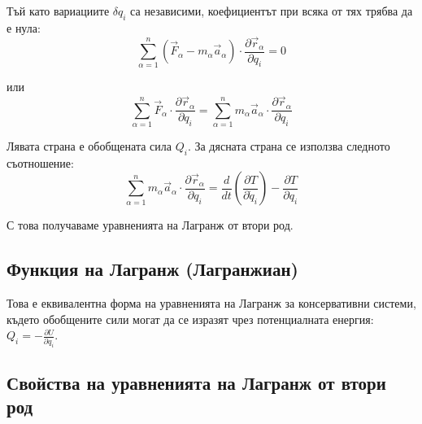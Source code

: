 \documentclass{report}
\begin{document}
Тъй като вариациите $\delta q_i$ са независими, коефициентът при всяка от тях трябва да е нула:
\begin{equation}
\sum_{\alpha=1}^{n} (\vec{F}_\alpha - m_\alpha \vec{a}_\alpha) \cdot \frac{\partial \vec{r}_\alpha}{\partial q_i} = 0
\end{equation}

или
\begin{equation}
\sum_{\alpha=1}^{n} \vec{F}_\alpha \cdot \frac{\partial \vec{r}_\alpha}{\partial q_i} = \sum_{\alpha=1}^{n} m_\alpha \vec{a}_\alpha \cdot \frac{\partial \vec{r}_\alpha}{\partial q_i}
\end{equation}

Лявата страна е обобщената сила $Q_i$. За дясната страна се използва следното съотношение:
\begin{equation}
\sum_{\alpha=1}^{n} m_\alpha \vec{a}_\alpha \cdot \frac{\partial \vec{r}_\alpha}{\partial q_i} = \frac{d}{dt} \left( \frac{\partial T}{\partial \dot{q}_i} \right) - \frac{\partial T}{\partial q_i}
\end{equation}

С това получаваме уравненията на Лагранж от втори род.

\subsection{Функция на Лагранж (Лагранжиан)}



Това е еквивалентна форма на уравненията на Лагранж за консервативни системи, където обобщените сили могат да се изразят чрез потенциалната енергия: $Q_i = -\frac{\partial U}{\partial q_i}$.



\subsection{Свойства на уравненията на Лагранж от втори род}
\end{document}
